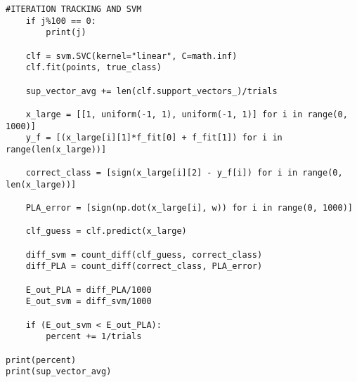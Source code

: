 \documentclass{article}
\begin{document}
\begin{verbatim}
#ITERATION TRACKING AND SVM   
    if j%100 == 0:
        print(j)
        
    clf = svm.SVC(kernel="linear", C=math.inf)
    clf.fit(points, true_class)
    
    sup_vector_avg += len(clf.support_vectors_)/trials
    
    x_large = [[1, uniform(-1, 1), uniform(-1, 1)] for i in range(0, 1000)]
    y_f = [(x_large[i][1]*f_fit[0] + f_fit[1]) for i in range(len(x_large))]

    correct_class = [sign(x_large[i][2] - y_f[i]) for i in range(0, len(x_large))]

    PLA_error = [sign(np.dot(x_large[i], w)) for i in range(0, 1000)]

    clf_guess = clf.predict(x_large)
    
    diff_svm = count_diff(clf_guess, correct_class)
    diff_PLA = count_diff(correct_class, PLA_error)
    
    E_out_PLA = diff_PLA/1000
    E_out_svm = diff_svm/1000
    
    if (E_out_svm < E_out_PLA):
        percent += 1/trials

print(percent)
print(sup_vector_avg)
\end{verbatim}
\end{document}
